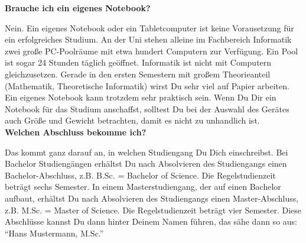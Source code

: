 {\textbf{Brauche ich ein eigenes Notebook?}

Nein. Ein eigenes Notebook oder ein Tabletcomputer ist keine Vorausetzung für ein erfolgreiches Studium. An der Uni stehen alleine im Fachbereich Informatik zwei große PC-Poolräume mit etwa hundert Computern zur Verfügung. Ein Pool ist sogar 24 Stunden täglich geöffnet. Informatik ist nicht mit Computern gleichzusetzen. Gerade in den ersten Semestern mit großem Theorieanteil (Mathematik, Theoretische Informatik) wirst Du sehr viel auf Papier arbeiten. Ein eigenes Notebook kann trotzdem sehr praktisch sein. Wenn Du Dir ein Notebook für das Studium anschaffst, solltest Du bei der Auswahl des Gerätes auch Größe und Gewicht betrachten, damit es nicht zu unhandlich ist.\\

\textbf{Welchen Abschluss bekomme ich?}

Das kommt ganz darauf an, in welchen Studiengang Du Dich einschreibst. Bei Bachelor Studiengängen erhältst Du nach Absolvieren des Studiengangs einen Bachelor-Abschluss, z.B. B.Sc. = Bachelor of Science. Die Regelstudienzeit beträgt sechs Semester. 
In einem Masterstudiengang, der auf einen Bachelor aufbaut, erhältst Du nach Absolvieren des Studiengangs einen Master-Abschluss, z.B. M.Sc. = Master of Science. Die Regelstudienzeit beträgt vier Semester.
Diese Abschlüsse kannst Du dann hinter Deinem Namen führen, das sähe dann so aus:\\ "`Hans Mustermann, M.Sc."'


}{}
\newpage